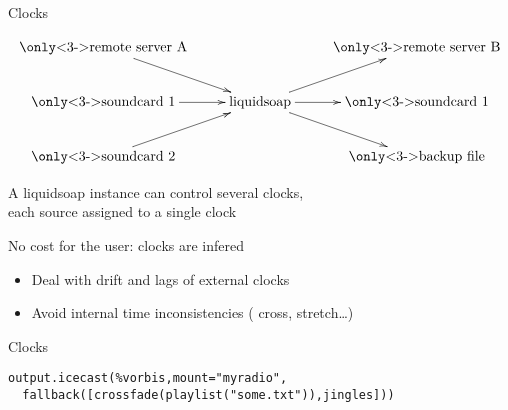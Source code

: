 \documentclass{beamer}
\newcommand{\kw}[1]{{\color{red} #1}}
\begin{document}

\begin{frame}{Clocks}

\[
\xymatrix{
  \text{\only<3->{\color{red}}remote server A} \ar[dr] &
        & \mbox{\only<3->{\color{gray}}remote server B} \\
  \text{\only<3->{\color{blue}}soundcard 1} \ar[r]      &
                \text{liquidsoap} \ar[ur]\ar[r]\ar[dr]
        & \mbox{\only<3->{\color{blue}}soundcard 1}     \\
  \text{\only<3->{\color{green}}soundcard 2} \ar[ur] &
        & \mbox{\only<3->{\color{blue}}backup file}
}
\]

\vspace{0.5cm}
\pause

\begin{center}
\large
  A liquidsoap instance can control several clocks, \\
  each source assigned to a single clock
{\begin{flushright}
\small No cost for the user: clocks are infered
\end{flushright}}
\end{center}

\pause
\pause

\begin{itemize}
\item Deal with drift and lags of external clocks
\item Avoid internal time inconsistencies (\kw{cross}, \kw{stretch}\ldots)
\end{itemize}

\end{frame}

\begin{frame}[fragile]{Clocks}

\begin{lstlisting}
output.icecast(%vorbis,mount="myradio",
  fallback([crossfade(playlist("some.txt")),jingles]))
\end{lstlisting}


\end{frame}
\end{document}
